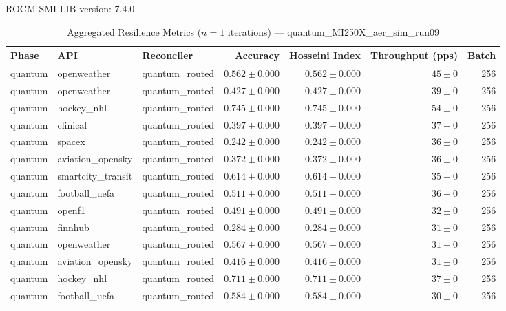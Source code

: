 ROCM-SMI-LIB version: 7.4.0

\begin{table}[htbp]
\caption{Aggregated Resilience Metrics ($n=1$ iterations) --- quantum_MI250X_aer_sim_run09}
\begin{tabular}{l l l r r r r}
\hline
Phase & API & Reconciler & Accuracy & Hosseini Index & Throughput (pps) & Batch \\
\hline
quantum & openweather & quantum\_routed & $0.562\pm0.000$ & $0.562\pm0.000$ & $45\pm0$ & 256 \\
quantum & openweather & quantum\_routed & $0.427\pm0.000$ & $0.427\pm0.000$ & $39\pm0$ & 256 \\
quantum & hockey\_nhl & quantum\_routed & $0.745\pm0.000$ & $0.745\pm0.000$ & $54\pm0$ & 256 \\
quantum & clinical & quantum\_routed & $0.397\pm0.000$ & $0.397\pm0.000$ & $37\pm0$ & 256 \\
quantum & spacex & quantum\_routed & $0.242\pm0.000$ & $0.242\pm0.000$ & $36\pm0$ & 256 \\
quantum & aviation\_opensky & quantum\_routed & $0.372\pm0.000$ & $0.372\pm0.000$ & $36\pm0$ & 256 \\
quantum & smartcity\_transit & quantum\_routed & $0.614\pm0.000$ & $0.614\pm0.000$ & $35\pm0$ & 256 \\
quantum & football\_uefa & quantum\_routed & $0.511\pm0.000$ & $0.511\pm0.000$ & $36\pm0$ & 256 \\
quantum & openf1 & quantum\_routed & $0.491\pm0.000$ & $0.491\pm0.000$ & $32\pm0$ & 256 \\
quantum & finnhub & quantum\_routed & $0.284\pm0.000$ & $0.284\pm0.000$ & $31\pm0$ & 256 \\
quantum & openweather & quantum\_routed & $0.567\pm0.000$ & $0.567\pm0.000$ & $31\pm0$ & 256 \\
quantum & aviation\_opensky & quantum\_routed & $0.416\pm0.000$ & $0.416\pm0.000$ & $31\pm0$ & 256 \\
quantum & hockey\_nhl & quantum\_routed & $0.711\pm0.000$ & $0.711\pm0.000$ & $37\pm0$ & 256 \\
quantum & football\_uefa & quantum\_routed & $0.584\pm0.000$ & $0.584\pm0.000$ & $30\pm0$ & 256 \\

\end{tabular}
\end{table}

